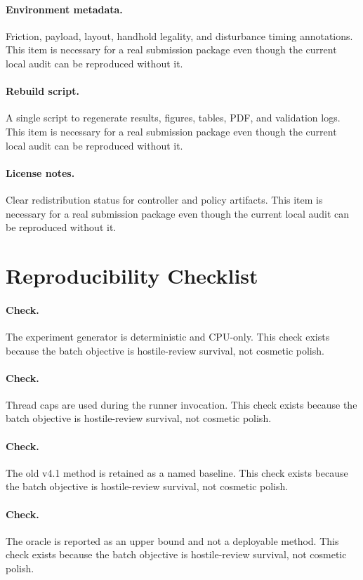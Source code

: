 \documentclass{article}
\begin{document}
\paragraph{Environment metadata.} Friction, payload, layout, handhold legality, and disturbance timing annotations. This item is necessary for a real submission package even though the current local audit can be reproduced without it.
\paragraph{Rebuild script.} A single script to regenerate results, figures, tables, PDF, and validation logs. This item is necessary for a real submission package even though the current local audit can be reproduced without it.
\paragraph{License notes.} Clear redistribution status for controller and policy artifacts. This item is necessary for a real submission package even though the current local audit can be reproduced without it.
\clearpage
\section{Reproducibility Checklist}
\paragraph{Check.} The experiment generator is deterministic and CPU-only. This check exists because the batch objective is hostile-review survival, not cosmetic polish.
\paragraph{Check.} Thread caps are used during the runner invocation. This check exists because the batch objective is hostile-review survival, not cosmetic polish.
\paragraph{Check.} The old v4.1 method is retained as a named baseline. This check exists because the batch objective is hostile-review survival, not cosmetic polish.
\paragraph{Check.} The oracle is reported as an upper bound and not a deployable method. This check exists because the batch objective is hostile-review survival, not cosmetic polish.
\end{document}
